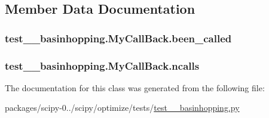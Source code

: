 \subsection{Member Data Documentation}
\hypertarget{classtest____basinhopping_1_1MyCallBack_a373aee3892a9063fb6d92cb0708bf408}{}
\subsubsection[{been\+\_\+called}]{\setlength{\rightskip}{0pt plus 5cm}test\+\_\+\+\_\+basinhopping.\+My\+Call\+Back.\+been\+\_\+called}\label{classtest____basinhopping_1_1MyCallBack_a373aee3892a9063fb6d92cb0708bf408}
\hypertarget{classtest____basinhopping_1_1MyCallBack_a727756bb6255d7c453d2579d32679ec1}{}
\subsubsection[{ncalls}]{\setlength{\rightskip}{0pt plus 5cm}test\+\_\+\+\_\+basinhopping.\+My\+Call\+Back.\+ncalls}\label{classtest____basinhopping_1_1MyCallBack_a727756bb6255d7c453d2579d32679ec1}


The documentation for this class was generated from the following file\+:\begin{DoxyCompactItemize}
\item 
packages/scipy-\/0../scipy/optimize/tests/\hyperlink{test____basinhopping_8py}{test\+\_\+\+\_\+basinhopping.\+py}\end{DoxyCompactItemize}

